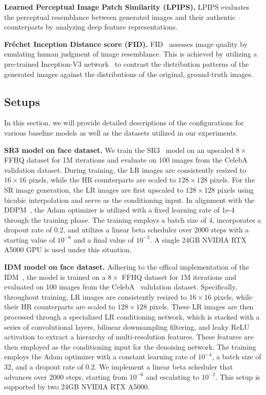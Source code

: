 \textbf{Learned Perceptual Image Patch Similarity (LPIPS).} LPIPS evaluates the perceptual resemblance between generated images and their authentic counterparts by analyzing deep feature representations.

\textbf{Fréchet Inception Distance score (FID).} FID~\cite{heusel2017gans} assesses image quality by emulating human judgment of image resemblance. This is achieved by utilizing a pre-trained Inception-V3 network~\cite{szegedy2016rethinking} to contrast the distribution patterns of the generated images against the distributions of the original, ground-truth images.
\subsection{Setups}

In this section, we will provide detailed descriptions of the configurations for various baseline models as well as the datasets utilized in our experiments. 

\textbf{SR3 model on face dataset.} We train the SR3~\cite{saharia2022image} model on an upscaled $8\times$ FFHQ dataset for 1M iterations and evaluate on 100 images from the CelebA~\cite{karras2017progressive} validation dataset. During training, the LR images are consistently resized to $16\times16$ pixels, while the HR counterparts are scaled to $128\times128$ pixels. For the SR image generation, the LR images are first upscaled to $128\times128$ pixels using bicubic interpolation and serve as the conditioning input. In alignment with the DDPM~\cite{ho2020denoising},  the Adam optimizer is utilized with a fixed learning rate of 1e-4 through the training phase. The training employs a batch size of 4, incorporates a dropout rate of 0.2, and utilizes a linear beta scheduler over 2000 steps with a starting value of 
$10^{-6}$ and a final value of $10^{-2}$. A single
24GB NVIDIA RTX A5000 GPU is used under this situation.

\textbf{IDM model on face dataset.} Adhering to the offical implementation of  the IDM~\cite{gao2023implicit}, the model is trained on a $8\times$ FFHQ dataset for 1M iterations and evaluated on 100 images from the CelebA~\cite{karras2017progressive} validation dataset. Specifically, throughout training, LR images are consistently resized to $16\times16$ pixels, while their HR counterparts are scaled to $128\times128$ pixels. These LR images are then processed through a specialized LR conditioning network, which is stacked with a series of convolutional layers, bilinear downsampling filtering, and leaky ReLU activation to extract a hierarchy of multi-resolution features. These features are then employed as the conditioning input for the denoising network. The training employs the Adam optimizer with a constant learning rate of $10^{-4}$, a batch size of 32, and a dropout rate of 0.2. We implement a linear beta scheduler that advances over 2000 steps, starting from $10^{-6}$ and escalating to $10^{-2}$. This setup is supported by two 24GB NVIDIA RTX A5000.

